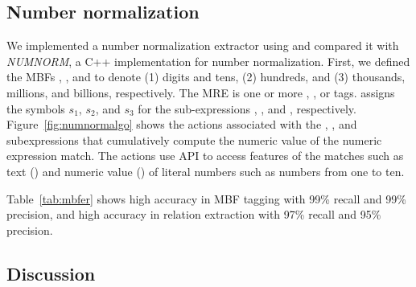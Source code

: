 \vspace{-1em}
\subsection{Number normalization}
\label{sec:sec:number}

We implemented a number normalization extractor using \framework and 
compared it with {\em NUMNORM}, a 
C++ implementation for number normalization. 
First, we defined the MBFs , , and 
to denote (1) digits and tens, (2) hundreds, and (3) 
thousands, millions, and billions, respectively.
The  MRE 
 is one or more , , or  tags. 
\framework assigns the symbols $s_1$, $s_2$, and $s_3$ 
for the sub-expressions , , and , respectively. 
Figure~\ref{fig:numnormalgo} shows the actions associated with the , , and  subexpressions that cumulatively compute the numeric value of the numeric expression match.
The actions use \framework API to access features of the matches such 
as text () and numeric 
value () of literal numbers such as numbers from one to ten.

Table~\ref{tab:mbfer} shows high accuracy in MBF tagging with 99\% recall and 99\% precision, and
high accuracy in relation extraction with 97\% recall and 95\% precision.

\vspace{-1em}
\subsection{Discussion}
\label{subsec:discuss}

